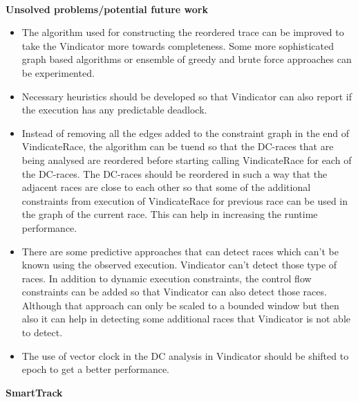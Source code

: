 \documentclass[20pt]{letter}
\begin{document}
\begin{enumerate}
{\textbf{\\Unsolved problems/potential future work}\\
\begin{itemize}
    \item The algorithm used for constructing the reordered trace can be improved to take the Vindicator more towards completeness. Some more sophisticated graph based algorithms or ensemble of greedy and brute force approaches can be experimented.
    \item Necessary heuristics should be developed so that Vindicator can also report if the execution has any predictable deadlock.
    \item Instead of removing all the edges added to the constraint graph in the end of VindicateRace, the algorithm can be tuend so that the DC-races that are being analysed are reordered before starting calling VindicateRace for each of the DC-races. The DC-races should be reordered in such a way that the adjacent races are close to each other so that some of the additional constraints from execution of VindicateRace for previous race can be used in the graph of the current race. This can help in increasing the runtime performance. 
    \item There are some predictive approaches that can detect races which can't be known using the observed execution. Vindicator can't detect those type of races. In addition to dynamic execution constraints, the control flow constraints can be added so that Vindicator can also detect those races. Although that approach can only be scaled to a bounded window but then also it can help in detecting some additional races that Vindicator is not able to detect. 
    \item The use of vector clock in the DC analysis in Vindicator should be shifted to epoch to get a better performance.
\end{itemize}
}

\pagebreak
{ \Large
\item
\begin{center}
    \textbf{SmartTrack}
\end{center}
}
{ \fontsize{13}{17}\selectfont\\

}
\end{enumerate}
\end{document}
